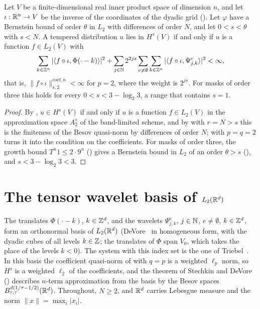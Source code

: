 \begin{corollary}
\label{cor:daub-rd-sobolev}
\leanok
{}
Let $V$ be a finite-dimensional real inner product space of dimension $n$, and let
$\iota : \mathbb{R}^n \to V$ be the inverse of the coordinates of the dyadic grid
(). Let $\varphi$ have a Bernstein bound of order $\theta$ in $L_2$
with differences of order $N$, and let $0 < s < \theta$ with $s < N$.
A tempered distribution $u$ lies in $H^s(V)$ if and only if $u$ is a function $f \in L_2(V)$ with
\[
  \sum_{k \in \mathbb{Z}^n} |\langle f \circ \iota, \Phi(\cdot - k) \rangle|^2
  + \sum_{j \in \mathbb{N}} 2^{2js} \sum_{e \neq \emptyset} \sum_{k \in \mathbb{Z}^n}
    |\langle f \circ \iota, \Psi^e_{j,k} \rangle|^2 < \infty ,
\]
that is, $\|f \circ \iota\|^{\mathrm{coef},n}_{s,2} < \infty$ for $p = 2$, where the weight is
$2^{js}$. For masks of order three this holds for every $0 < s < 3 - \log_2 3$, a range that
contains $s = 1$.
\end{corollary}

\begin{proof}
\leanok
{}
By , $u \in H^s(V)$ if and only if $u$ is a function $f \in L_2(V)$
in the approximation space $A^s_2$ of the band-limited scheme, and by  with
$r = N > s$ this is the finiteness of the Besov quasi-norm by differences of order $N$;
 with $p = q = 2$ turns it into the condition on the coefficients.
For masks of order three, the growth bound $T^n 1 \leq 2 \cdot 9^n$
() gives a Bernstein bound in $L_2$ of an order $\theta > s$
(), and $s < 3 - \log_2 3 < 3$.
\end{proof}

\section{The tensor wavelet basis of \texorpdfstring{$L_2(\mathbb{R}^d)$}{L\_2(R\^{}d)}}
\label{sec:daub-rd-basis}

The translates $\Phi(\cdot - k)$, $k \in \mathbb{Z}^d$, and the wavelets $\Psi^e_{j,k}$, $j \in \mathbb{N}$,
$e \neq \emptyset$, $k \in \mathbb{Z}^d$, form an orthonormal basis of $L_2(\mathbb{R}^d)$
(DeVore~\cite[(7.18) and (7.19)]{DeVore1998} in homogeneous form, with the dyadic cubes of all
levels $k \in \mathbb{Z}$; the translates of $\Phi$ span $V_0$, which takes the place of the levels
$k < 0$). The system with this index set is the one of
Triebel~\cite[Theorem~1.20]{Triebel2008}. In this basis the coefficient quasi-norm of
 with $q = p$ is a weighted $\ell_p$ norm, so $H^s$ is a weighted
$\ell_2$ of the coefficients, and the theorem of Stechkin and DeVore ()
describes $n$-term approximation from the basis by the Besov spaces
$B^{d(1/\tau - 1/2)}_{\tau,\tau}(\mathbb{R}^d)$. Throughout, $N \geq 2$, and $\mathbb{R}^d$ carries Lebesgue
measure and the norm $\|x\| = \max_i |x_i|$.

